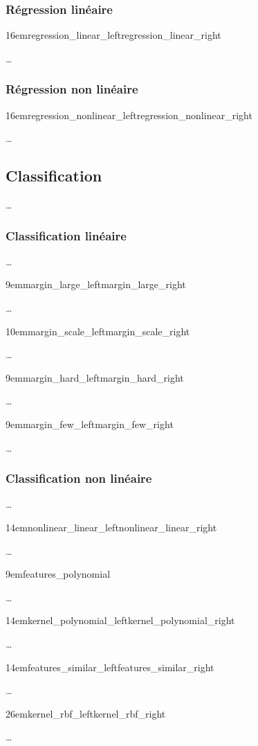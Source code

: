 \subsubsection{Régression linéaire}

{16em}{regression_linear_left}{regression_linear_right}

…

\subsubsection{Régression non linéaire}

{16em}{regression_nonlinear_left}{regression_nonlinear_right}

…

\subsection{Classification}

…

\subsubsection{Classification linéaire}

…

{9em}{margin_large_left}{margin_large_right}

…

{10em}{margin_scale_left}{margin_scale_right}

…

{9em}{margin_hard_left}{margin_hard_right}

…

{9em}{margin_few_left}{margin_few_right}

…

\subsubsection{Classification non linéaire}

…

{14em}{nonlinear_linear_left}{nonlinear_linear_right}

…

{9em}{features_polynomial}

…

{14em}{kernel_polynomial_left}{kernel_polynomial_right}

…

{14em}{features_similar_left}{features_similar_right}

…

{26em}{kernel_rbf_left}{kernel_rbf_right}

…

\cite{svm}

\pagebreak
